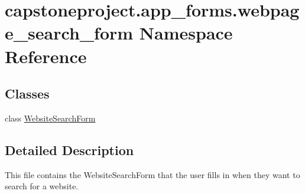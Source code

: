 \hypertarget{namespacecapstoneproject_1_1app__forms_1_1webpage__search__form}{}\section{capstoneproject.\+app\+\_\+forms.\+webpage\+\_\+search\+\_\+form Namespace Reference}
\label{namespacecapstoneproject_1_1app__forms_1_1webpage__search__form}
\subsection*{Classes}
\begin{DoxyCompactItemize}
\item 
class \mbox{\hyperlink{classcapstoneproject_1_1app__forms_1_1webpage__search__form_1_1_website_search_form}{Website\+Search\+Form}}
\end{DoxyCompactItemize}


\subsection{Detailed Description}
\begin{DoxyVerb}This file contains the WebsiteSearchForm that the user fills in when they want to search for a website.
\end{DoxyVerb}
 